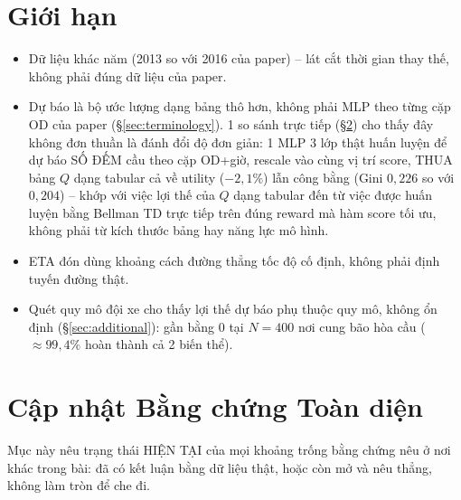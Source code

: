 \documentclass[10pt,twocolumn,a4paper]{article}
\begin{document}
\section{Giới hạn}
\begin{itemize}
\item Dữ liệu khác năm (2013 so với 2016 của paper) -- lát cắt thời gian
thay thế, không phải đúng dữ liệu của paper.
\item Dự báo là bộ ước lượng dạng bảng thô hơn, không phải MLP theo từng
cặp OD của paper (\S\ref{sec:terminology}). 1 so sánh trực tiếp
(\S\ref{sec:missing}) cho thấy đây không đơn thuần là đánh đổi độ đơn
giản: 1 MLP 3 lớp thật huấn luyện để dự báo SỐ ĐẾM cầu theo cặp OD+giờ,
rescale vào cùng vị trí score, THUA bảng $Q$ dạng tabular cả về utility
($-2,1\%$) lẫn công bằng (Gini $0,226$ so với $0,204$) -- khớp với việc lợi
thế của $Q$ dạng tabular đến từ việc được huấn luyện bằng Bellman TD trực
tiếp trên đúng reward mà hàm score tối ưu, không phải từ kích thước bảng
hay năng lực mô hình.
\item ETA đón dùng khoảng cách đường thẳng tốc độ cố định, không phải định
tuyến đường thật.
\item Quét quy mô đội xe cho thấy lợi thế dự báo phụ thuộc quy mô, không
ổn định (\S\ref{sec:additional}): gần bằng 0 tại $N=400$ nơi cung bão hòa
cầu ($\approx99,4\%$ hoàn thành cả 2 biến thể).
\end{itemize}

\section{Cập nhật Bằng chứng Toàn diện}
\label{sec:missing}
Mục này nêu trạng thái HIỆN TẠI của mọi khoảng trống bằng chứng nêu ở nơi
khác trong bài: đã có kết luận bằng dữ liệu thật, hoặc còn mở và nêu thẳng,
không làm tròn để che đi.
\end{document}

